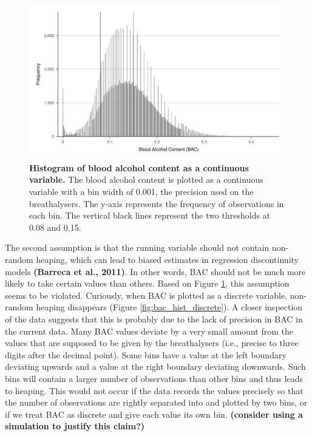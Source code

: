 \documentclass[
  11pt,
]{article}
\begin{document}
\begin{figure}[H]
  \centering
  \includegraphics[width=0.9\columnwidth]{../figures/bac_histogram_continuous.pdf}
  \caption{\textbf{Histogram of blood alcohol content as a continuous variable.} The blood alcohol content is plotted as a continuous variable with a bin width of 0.001, the precision used on the breathalysers. The y-axis represents the frequency of observations in each bin. The vertical black lines represent the two thresholds at 0.08 and 0.15.}
  \label{fig:bac_hist_continuous}
\end{figure}

The second assumption is that the running variable should not contain
non-random heaping, which can lead to biased estimates in regression
discontinuity models \textbf{(Barreca et al., 2011)}. In other words,
BAC should not be much more likely to take certain values than others.
Based on Figure \ref{fig:bac_hist_continuous}, this assumption seems to
be violated. Curiously, when BAC is plotted as a discrete variable,
non-random heaping disappears (Figure \ref{fig:bac_hist_discrete}). A
closer inspection of the data suggests that this is probably due to the
lack of precision in BAC in the current data. Many BAC values deviate by
a very small amount from the values that are supposed to be given by the
breathalysers (i.e., precise to three digits after the decimal point).
Some bins have a value at the left boundary deviating upwards and a
value at the right boundary deviating downwards. Such bins will contain
a larger number of observations than other bins and thus leads to
heaping. This would not occur if the data records the values precisely
so that the number of observations are rightly separated into and
plotted by two bins, or if we treat BAC as discrete and give each value
its own bin. \textbf{(consider using a simulation to justify this
claim?)}
\end{document}

